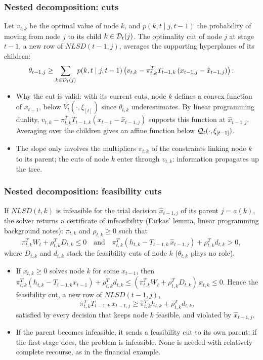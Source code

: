 \documentclass[aspectratio=169]{beamer}
\begin{document}
\begin{frame}
\frametitle{Nested decomposition: cuts}

Let $v_{t,k}$ be the optimal value of node $k$, and $p(k, t \mid j, t-1)$ the probability of moving from node $j$ to its child $k \in {\mathcal{D}}_t(j)$.
The optimality cut of node $j$ at stage $t-1$, a new row of $NLSD(t-1,j)$, averages the supporting hyperplanes of its children:
\[
\theta_{t-1,j} \geq \sum_{k \in {\mathcal{D}}_t(j)} p(k, t \mid j, t-1) \left( v_{t,k} - \pi_{t,k}^T T_{t-1,k} \left( x_{t-1,j} - \hat{x}_{t-1,j} \right) \right).
\]
\begin{itemize}
\item
{\red Why the cut is valid}: with its current cuts, node $k$ defines a convex function of $x_{t-1}$, below $V_t(\cdot, \xi_{[t]})$ since $\theta_{t,k}$ underestimates.
By linear programming duality, $v_{t,k} - \pi_{t,k}^T T_{t-1,k}(x_{t-1} - \hat{x}_{t-1,j})$ supports this function at $\hat{x}_{t-1,j}$.
Averaging over the children gives an affine function below ${\mathcal{Q}}_t(\cdot, \xi_{[t-1]})$.
\item
The slope only involves the multipliers $\pi_{t,k}$ of the constraints linking node $k$ to its parent; the cuts of node $k$ enter through $v_{t,k}$: information {\red propagates up the tree}.
\end{itemize}

\end{frame}

\begin{frame}
\frametitle{Nested decomposition: feasibility cuts}

If $NLSD(t,k)$ is infeasible for the trial decision $\hat{x}_{t-1,j}$ of its parent $j = a(k)$, the solver returns a {\red certificate of infeasibility} (Farkas' lemma, linear programming background notes): $\pi_{t,k}$ and $\rho_{t,k} \geq 0$ such that
\[
\pi_{t,k}^T W_t + \rho_{t,k}^T D_{t,k} \leq 0
\quad \text{and} \quad
\pi_{t,k}^T \left( h_{t,k} - T_{t-1,k}\, \hat{x}_{t-1,j} \right) + \rho_{t,k}^T d_{t,k} > 0,
\]
where $D_{t,k}$ and $d_{t,k}$ stack the feasibility cuts of node $k$ ($\theta_{t,k}$ plays no role).
\begin{small}
\begin{itemize}
\item
If $x_{t,k} \geq 0$ solves node $k$ for some $x_{t-1}$, then $\pi_{t,k}^T (h_{t,k} - T_{t-1,k} x_{t-1}) + \rho_{t,k}^T d_{t,k} \leq (\pi_{t,k}^T W_t + \rho_{t,k}^T D_{t,k})\, x_{t,k} \leq 0$.
Hence the {\red feasibility cut}, a new row of $NLSD(t-1,j)$,
\[
\pi_{t,k}^T T_{t-1,k}\, x_{t-1,j} \geq \pi_{t,k}^T h_{t,k} + \rho_{t,k}^T d_{t,k},
\]
satisfied by every decision that keeps node $k$ feasible, and violated by $\hat{x}_{t-1,j}$.
\item
If the parent becomes infeasible, it sends a feasibility cut to its own parent; if the first stage does, the problem is infeasible.
None is needed with relatively complete recourse, as in the financial example.
\end{itemize}
\end{small}

\end{frame}
\end{document}
